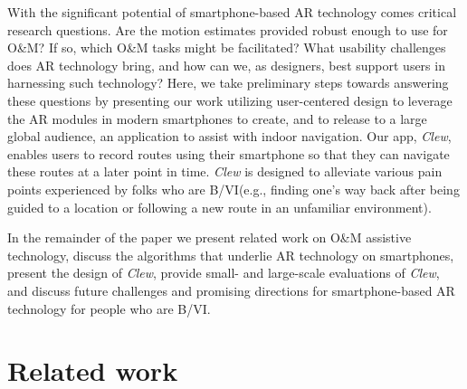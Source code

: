 \documentclass[chi_draft]{sigchi}
\newcommand{\BVI}{B/VI\xspace}
\newcommand{\OM}{O\&M\xspace}
\begin{document}
With the significant potential of smartphone-based AR technology comes critical research questions.  Are the motion estimates provided robust enough to use for \OM? If so, which \OM tasks might be facilitated?  What usability challenges does AR technology bring, and how can we, as designers, best support users in harnessing such technology?  Here, we take preliminary steps towards answering these questions by presenting our work utilizing user-centered design to leverage the AR modules in modern smartphones to create, and to release to a large global audience, an application to assist with indoor navigation.  Our app, \emph{Clew}, enables users to record routes using their smartphone so that they can navigate these routes at a later point in time.  \emph{Clew} is designed to alleviate various pain points experienced by folks who are \BVI (e.g., finding one's way back after being guided to a location or following a new route in an unfamiliar environment).%

In the remainder of the paper we present related work on \OM assistive technology, discuss the algorithms that underlie AR technology on smartphones, present the design of \emph{Clew}, provide small- and large-scale evaluations of \emph{Clew}, and discuss future challenges and promising directions for smartphone-based AR technology for people who are \BVI.

\section{Related work}
\end{document}
